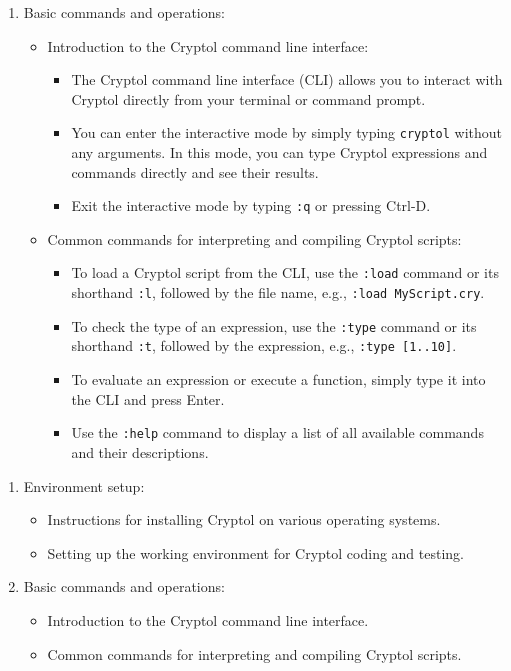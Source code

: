 \newpage
\begin{enumerate}
	\item Basic commands and operations:
	\begin{itemize}
		\item Introduction to the Cryptol command line interface:
		\begin{itemize}
			\item The Cryptol command line interface (CLI) allows you to interact with Cryptol directly from your terminal or command prompt.
			\item You can enter the interactive mode by simply typing \texttt{cryptol} without any arguments. In this mode, you can type Cryptol expressions and commands directly and see their results.
			\item Exit the interactive mode by typing \texttt{:q} or pressing Ctrl-D.
		\end{itemize}
		\item Common commands for interpreting and compiling Cryptol scripts:
		\begin{itemize}
			\item To load a Cryptol script from the CLI, use the \texttt{:load} command or its shorthand \texttt{:l}, followed by the file name, e.g., \texttt{:load MyScript.cry}.
			\item To check the type of an expression, use the \texttt{:type} command or its shorthand \texttt{:t}, followed by the expression, e.g., \texttt{:type [1..10]}.
			\item To evaluate an expression or execute a function, simply type it into the CLI and press Enter.
			\item Use the \texttt{:help} command to display a list of all available commands and their descriptions.
		\end{itemize}
	\end{itemize}
\end{enumerate}
\begin{enumerate}
	\item Environment setup:
	\begin{itemize}
		\item Instructions for installing Cryptol on various operating systems.
		\item Setting up the working environment for Cryptol coding and testing.
	\end{itemize}
	\item Basic commands and operations:
	\begin{itemize}
		\item Introduction to the Cryptol command line interface.
		\item Common commands for interpreting and compiling Cryptol scripts.
	\end{itemize}
\end{enumerate}

